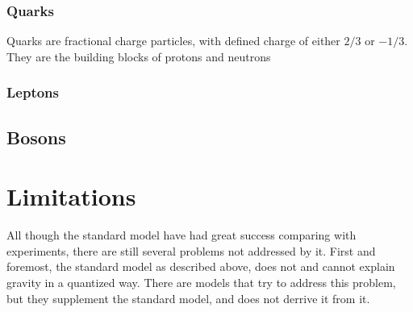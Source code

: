 \subsubsection*{Quarks}
Quarks are fractional charge particles, with defined charge of either $2/3$ or $-1/3$. They are the building blocks of protons and neutrons

\subsubsection*{Leptons}

\subsection*{Bosons}

\section*{Limitations}
All though the standard model have had great success comparing with experiments,
there are still several problems not addressed by it. First and foremost, the standard model
as described above, does not and cannot explain gravity in a quantized way. There 
are models that try to address this problem, but they supplement the standard model,
and does not derrive it from it. 

